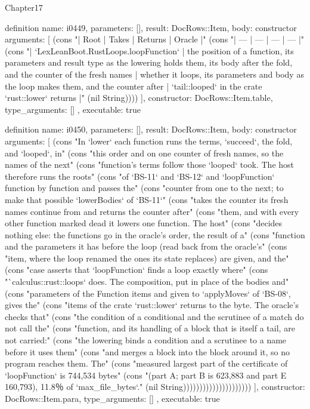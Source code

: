 \begin{lexlean}{Chapter17}
\begin{semanticmodule}
definition{
  name: i0449,
  parameters: [],
  result: DocRows::Item,
  body: constructor{
    arguments: [
      (cons "| Root | Takes | Returns | Oracle |" (cons "| --- | --- | --- | --- |" (cons "| `LexLeanBoot.RustLoops.loopFunction` | the position of a function, its parameters and result type as the lowering holds them, its body after the fold, and the counter of the fresh names | whether it loops, its parameters and body as the loop makes them, and the counter after | `tail::looped` in the crate `rust::lower` returns |" (nil String))))
    ],
    constructor: DocRows::Item.table,
    type_arguments: []
  },
  executable: true
}

definition{
  name: i0450,
  parameters: [],
  result: DocRows::Item,
  body: constructor{
    arguments: [
      (cons "In `lower` each function runs the terms, `succeed`, the fold, and `looped`, in" (cons "this order and on one counter of fresh names, so the names of the next" (cons "function's terms follow those `looped` took. The host therefore runs the roots" (cons "of `BS-11` and `BS-12` and `loopFunction` function by function and passes the" (cons "counter from one to the next; to make that possible `lowerBodies` of `BS-11`" (cons "takes the counter its fresh names continue from and returns the counter after" (cons "them, and with every other function marked dead it lowers one function. The host" (cons "decides nothing else: the functions go in the oracle's order, the result of a" (cons "function and the parameters it has before the loop (read back from the oracle's" (cons "item, where the loop renamed the ones its state replaces) are given, and the" (cons "case asserts that `loopFunction` finds a loop exactly where" (cons "`calculus::rust::loops` does. The composition, put in place of the bodies and" (cons "parameters of the Function items and given to `applyMoves` of `BS-08`, gives the" (cons "items of the crate `rust::lower` returns to the byte. The oracle's checks that" (cons "the condition of a conditional and the scrutinee of a match do not call the" (cons "function, and its handling of a block that is itself a tail, are not carried:" (cons "the lowering binds a condition and a scrutinee to a name before it uses them" (cons "and merges a block into the block around it, so no program reaches them. The" (cons "measured largest part of the certificate of `loopFunction` is 744,534 bytes" (cons "(part A; part B is 623,883 and part E 160,793), 11.8％ of `max_file_bytes`." (nil String)))))))))))))))))))))
    ],
    constructor: DocRows::Item.para,
    type_arguments: []
  },
  executable: true
}


\end{semanticmodule}
\end{lexlean}
